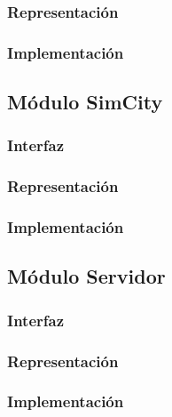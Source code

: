 \documentclass[]{aed2-tp}
\begin{document}
\newpage
\subsubsection{Representación}


\newpage
\subsubsection{Implementación}


\newpage
\subsection{Módulo SimCity}
\subsubsection{Interfaz}


\newpage
\subsubsection{Representación}


\newpage
\subsubsection{Implementación}


\newpage
\subsection{Módulo Servidor}
\subsubsection{Interfaz}


\newpage
\subsubsection{Representación}


\newpage
\subsubsection{Implementación}

\end{document}

